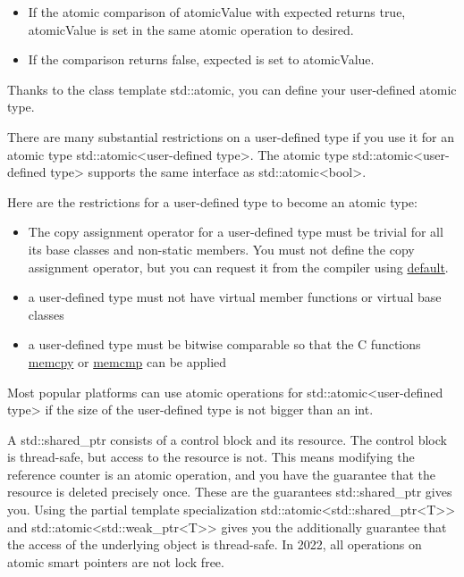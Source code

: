 \begin{itemize}
\item 
If the atomic comparison of atomicValue with expected returns true, atomicValue is set in the same atomic operation to desired.

\item 
If the comparison returns false, expected is set to atomicValue.
\end{itemize}


Thanks to the class template std::atomic, you can define your user-defined atomic type.

There are many substantial restrictions on a user-defined type if you use it for an atomic type std::atomic<user-defined type>. The atomic type std::atomic<user-defined type> supports the same interface as std::atomic<bool>.

Here are the restrictions for a user-defined type to become an atomic type:

\begin{itemize}
\item 
The copy assignment operator for a user-defined type must be trivial for all its base classes and non-static members. You must not define the copy assignment operator, but you can request it from the compiler using \href{http://en.cppreference.com/w/cpp/keyword/default}{default}.

\item 
a user-defined type must not have virtual member functions or virtual base classes

\item 
a user-defined type must be bitwise comparable so that the C functions \href{http://en.cppreference.com/w/cpp/string/byte/memcpy}{memcpy} or \href{http://en.cppreference.com/w/cpp/string/byte/memcmp}{memcmp} can be applied
\end{itemize}

Most popular platforms can use atomic operations for std::atomic<user-defined type> if the size of the user-defined type is not bigger than an int.


A std::shared\_ptr consists of a control block and its resource. The control block is thread-safe, but access to the resource is not. This means modifying the reference counter is an atomic operation, and you have the guarantee that the resource is deleted precisely once. These are the guarantees std::shared\_ptr gives you. Using the partial template specialization std::atomic<std::shared\_ptr<T>{}> and std::atomic<std::weak\_ptr<T>{}> gives you the additionally guarantee that the access of the underlying object is thread-safe. In 2022, all operations on atomic smart pointers are not lock free.

